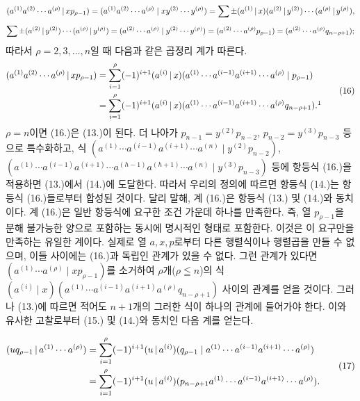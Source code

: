 \[
(a^{(1)}a^{(2)}\cdots a^{(\rho)}\,|\,xp_{\rho-1})
=(a^{(1)}a^{(2)}\cdots a^{(\rho)}\mid xy^{(2)}\cdots y^{(\rho)})
=\sum\pm(a^{(1)}\,|\,x)(a^{(2)}\,|\,y^{(2)})\cdots(a^{(\rho)}\,|\,y^{(\rho)}),
\]
\[
\sum\pm(a^{(2)}\,|\,y^{(2)})\cdots(a^{(\rho)}\,|\,y^{(\rho)})
=(a^{(2)}\cdots a^{(\rho)}\mid y^{(2)}\cdots y^{(\rho)})
=(a^{(2)}\cdots a^{(\rho)}p_{\rho-1})=(a^{(2)}\cdots a^{(\rho)}q_{n-\rho+1});
\]
따라서 $\rho=2,3,\ldots,n$일 때 다음과 같은 곱정리 계가 따른다.
\begin{equation}
\begin{aligned}
\pair{a^{(1)}a^{(2)}\cdots a^{(\rho)}}{xp_{\rho-1}}
 &=\sum_{i=1}^{\rho}(-1)^{i+1}\pair{a^{(i)}}{x}(a^{(1)}\cdots a^{(i-1)}a^{(i+1)}\cdots a^{(\rho)}\mid p_{\rho-1})\\
 &=\sum_{i=1}^{\rho}(-1)^{i+1}\pair{a^{(i)}}{x}(a^{(1)}\cdots a^{(i-1)}a^{(i+1)}\cdots a^{(\rho)}q_{n-\rho+1}).\footnotemark
\end{aligned}
\tag{16}
\end{equation}
$\rho=n$이면 (16.)은 (13.)이 된다. 더 나아가 $p_{n-1}=y^{(2)}p_{n-2}$, $p_{n-2}=y^{(3)}p_{n-3}$ 등으로 특수화하고, 식 $(a^{(1)}\cdots a^{(i-1)}a^{(i+1)}\cdots a^{(n)}\mid y^{(2)}p_{n-2})$, $(a^{(1)}\cdots a^{(i-1)}a^{(i+1)}\cdots a^{(h-1)}a^{(h+1)}\cdots a^{(n)}\mid y^{(3)}p_{n-3})$ 등에 항등식 (16.)을 적용하면 (13.)에서 (14.)에 도달한다. 따라서 우리의 정의에 따르면 항등식 (14.)는 항등식 (16.)들로부터 합성된 것이다. 달리 말해, 계 (16.)은 항등식 (13.) 및 (14.)와 동치이다. 계 (16.)은 일반 항등식에 요구한 조건 가운데 하나를 만족한다. 즉, 열 $p_{\rho-1}$을 분해 불가능한 양으로 포함하는 동시에 명시적인 형태로 포함한다. 이것은 이 요구만을 만족하는 유일한 계이다. 실제로 열 $a,x,p$로부터 다른 행렬식이나 행렬곱을 만들 수 없으며, 이들 사이에는 (16.)과 독립인 관계가 있을 수 없다. 그런 관계가 있다면 $(a^{(1)}\cdots a^{(\rho)}\mid xp_{\rho-1})$를 소거하여 $\rho$개($\rho\leqq n$)의 식 $(a^{(i)}\mid x)(a^{(1)}\cdots a^{(i-1)}a^{(i+1)}a^{(\rho)}q_{n-\rho+1})$ 사이의 관계를 얻을 것이다. 그러나 (13.)에 따르면 적어도 $n+1$개의 그러한 식이 하나의 관계에 들어가야 한다. 이와 유사한 고찰로부터 (15.) 및 (14.)와 동치인 다음 계를 얻는다.

\begin{equation}
\begin{aligned}
(u q_{\rho-1}\,|\,a^{(1)}\cdots a^{(\rho)})
 &=\sum_{i=1}^{\rho}(-1)^{i+1}(u\,|\,a^{(i)})(q_{\rho-1}\mid a^{(1)}\cdots a^{(i-1)}a^{(i+1)}\cdots a^{(\rho)})\\
 &=\sum_{i=1}^{\rho}(-1)^{i+1}(u\,|\,a^{(i)})(p_{n-\rho+1}a^{(1)}\cdots a^{(i-1)}a^{(i+1)}\cdots a^{(\rho)}).
\end{aligned}
\tag{17}
\end{equation}

